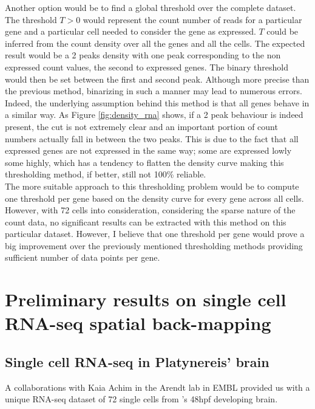   Another option would be to find a global threshold over the complete dataset. The threshold $T>0$ would represent the count number of reads for a particular gene and a particular cell needed to consider the gene as expressed. $T$ could be inferred from the count density over all the genes and all the cells. The expected result would be a 2 peaks density with one peak corresponding to the non expressed count values, the second to expressed genes. The binary threshold would then be set between the first and second peak. Although more precise than the previous method, binarizing in such a manner may lead to numerous errors. Indeed, the underlying assumption behind this method is that all genes behave in a similar way. As Figure \ref{fig:density_rna} shows, if a 2 peak behaviour is indeed present, the cut is not extremely clear and an important portion of count numbers actually fall in between the two peaks. This is due to the fact that all expressed genes are not expressed in the same way; some are expressed lowly some highly, which has a tendency to flatten the density curve making this thresholding method, if better, still not 100\% reliable.\\
  
  The more suitable approach to this thresholding problem would be to compute one threshold per gene based on the density curve for every gene across all cells. However, with 72 cells into consideration, considering the sparse nature of the count data, no significant results can be extracted with this method on this particular dataset. However, I believe that one threshold per gene would prove a big improvement over the previously mentioned thresholding methods providing sufficient number of data points per gene.

\section{Preliminary results on single cell RNA-seq spatial back-mapping
}\label{sec:back_mapping_platy}
  \subsection{Single cell RNA-seq in Platynereis' brain}
  
    	A collaborations with Kaia Achim in the Arendt lab in EMBL provided us with a unique RNA-seq dataset of 72 single cells from \platy{}'s 48hpf developing brain. 
    	
